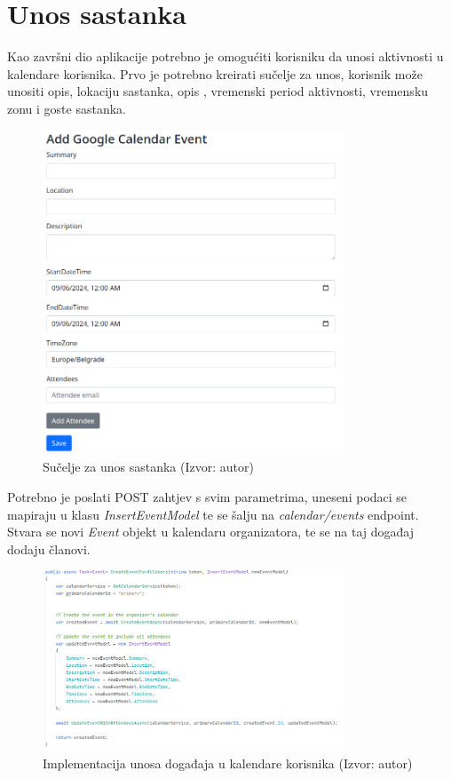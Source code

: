\documentclass{foi}
\begin{document}
\section{Unos sastanka}
Kao završni dio aplikacije potrebno je omogućiti korisniku da unosi aktivnosti u kalendare korisnika. Prvo je potrebno kreirati sučelje za unos, korisnik može unositi opis, lokaciju sastanka, opis , vremenski period aktivnosti, vremensku zonu i goste sastanka.
\begin{figure}[H]
    \centering
    \includegraphics[width=0.8\textwidth]{slike/insertMeeting.png}
    \caption{Sučelje za unos sastanka (Izvor: autor)}
    \label{fig:InsertMeeting}
\end{figure}
Potrebno je poslati POST zahtjev s svim parametrima, uneseni podaci se mapiraju u klasu \textit{InsertEventModel} te se šalju na \textit{calendar/events} endpoint. Stvara se novi \textit{Event} objekt u kalendaru organizatora, te se na taj događaj dodaju članovi.
\begin{figure}[H]
    \centering
    \includegraphics[width=0.8\textwidth]{slike/createEventForAllUsers.png}
    \caption{Implementacija unosa događaja u kalendare korisnika (Izvor: autor)}
    \label{fig:createEventForAllUsers}
\end{figure}
\end{document}
